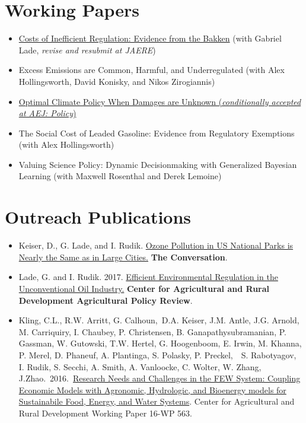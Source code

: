 \documentclass{res} %
\begin{document}
\begin{resume}
\section{Working Papers}

\begin{itemize} %
	\item[] \href{https://papers.ssrn.com/sol3/papers.cfm?abstract_id=3086728}{Costs of Inefficient Regulation: Evidence from the Bakken} (with Gabriel Lade, \textit{revise and resubmit at JAERE})
	\item[] Excess Emissions are Common, Harmful, and Underregulated (with Alex Hollingsworth, David Konisky, and Nikos Zirogiannis)
	\item[] \href{http://papers.ssrn.com/sol3/papers.cfm?abstract_id=2516632}{Optimal Climate Policy When Damages are Unknown (\textit{conditionally accepted at AEJ: Policy})}
	\item[] The Social Cost of Leaded Gasoline: Evidence from Regulatory Exemptions (with Alex Hollingsworth)
	\item[] Valuing Science Policy: Dynamic Decisionmaking with Generalized Bayesian Learning (with Maxwell Rosenthal and Derek Lemoine)

\end{itemize}
\vspace{-.075in}
\section{Outreach Publications}

\begin{itemize} %
	\item[] Keiser, D., G. Lade, and I. Rudik. \href{https://theconversation.com/ozone-pollution-in-us-national-parks-is-nearly-the-same-as-in-large-cities-100148}{Ozone Pollution in US National Parks is Nearly the Same as in Large Cities.} \textbf{The Conversation}.
	\item[] Lade, G. and I. Rudik. 2017. \href{https://www.card.iastate.edu/ag_policy_review/display.aspx?id=70}{Efficient Environmental Regulation in the Unconventional Oil Industry.} \textbf{Center for Agricultural and Rural Development Agricultural Policy Review}.
	\item[] Kling, C.L., R.W. Arritt, G. Calhoun, D.A. Keiser, J.M. Antle, J.G. Arnold, M. Carriquiry, I. Chaubey, P. Christensen, B. Ganapathysubramanian, P. Gassman, W. Gutowski, T.W. Hertel, G. Hoogenboom, E. Irwin, M. Khanna, P. Merel, D. Phaneuf, A. Plantinga, S. Polasky, P. Preckel,  S. Rabotyagov, I. Rudik, S. Secchi, A. Smith, A. Vanloocke, C. Wolter, W. Zhang, J.Zhao. 2016. \href{http://www.card.iastate.edu/products/publications/pdf/16wp563.pdf}{Research Needs and Challenges in the FEW System: Coupling Economic Models with Agronomic, Hydrologic, and Bioenergy models for Sustainabile Food, Energy, and Water Systems}. Center for Agricultural and Rural Development Working Paper 16-WP 563.
\end{itemize}
\vspace{-.075in}

\end{resume}
\end{document}
